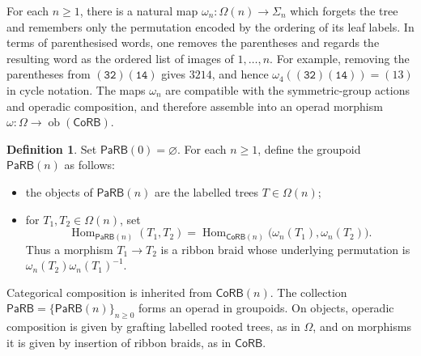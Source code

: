 \documentclass{amsart}
\newcommand{\CoRB}{\mathsf{CoRB}}
\newcommand{\PaRB}{\mathsf{PaRB}}
\newcommand{\magma}{\mathsf{\Omega}}
\newcommand{\Hom}{\operatorname{Hom}}
\newcommand{\ob}{\operatorname{ob}}
\theoremstyle{definition}
\newtheorem{definition}[theorem]{Definition}%
\numberwithin{equation}{section}
\begin{document}
For each $n\geq1$, there is a natural map $\omega_n\colon\magma(n)\to\Sigma_n$ which forgets the tree and remembers only the permutation encoded by the ordering of its leaf labels. In terms of parenthesised words, one removes the parentheses and regards the resulting word as the ordered list of images of $1,\ldots,n$. For example, removing the parentheses from $\mathtt{(32)(14)}$ gives $3214$, and hence $\omega_4(\mathtt{(32)(14)})=(13)$ in cycle notation. The maps $\omega_n$ are compatible with the symmetric-group actions and operadic composition, and therefore assemble into an operad morphism $\omega\colon\magma\to\ob(\CoRB)$.

\begin{definition}
\label{def: PaRB}
Set $\PaRB(0)=\varnothing$. For each $n\geq1$, define the groupoid
$\PaRB(n)$ as follows:
\begin{itemize}
\item the objects of $\PaRB(n)$ are the labelled trees $T\in\magma(n)$;
\item for $T_1,T_2\in\magma(n)$, set
\[
\Hom_{\PaRB(n)}(T_1,T_2) = \Hom_{\CoRB(n)}\bigl(\omega_n(T_1),\omega_n(T_2)\bigr).
\]
Thus a morphism $T_1\to T_2$ is a ribbon braid whose underlying permutation is $\omega_n(T_2)\omega_n(T_1)^{-1}$.
\end{itemize}

Categorical composition is inherited from $\CoRB(n)$. The collection $\PaRB=\{\PaRB(n)\}_{n\geq0}$ forms an operad in groupoids. On objects, operadic composition is given by grafting labelled rooted trees, as in $\magma$, and on morphisms it is given by insertion of ribbon braids, as in $\CoRB$.
\end{definition}

\end{document}
